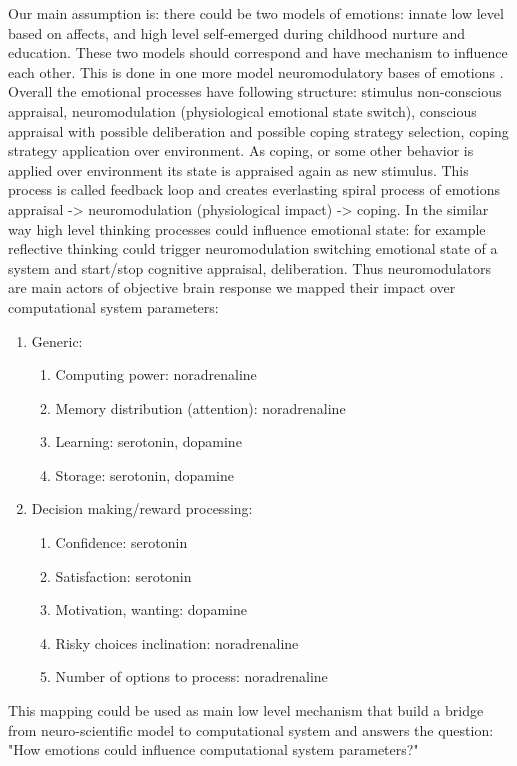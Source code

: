 Our main assumption is: there could be two models of emotions: innate low level based on affects, and high level self-emerged during childhood nurture and education. These two models should correspond and have mechanism to influence each other. This is done in one more model neuromodulatory bases of emotions \cite{cubeofemotions, neuromodulatory}.
Overall the emotional processes have following structure: stimulus non-conscious appraisal, neuromodulation (physiological emotional state switch), conscious appraisal with possible deliberation and possible coping strategy selection, coping strategy application over environment. As coping, or some other behavior is applied over environment its state is appraised again as new stimulus. This process is called feedback loop \cite{natureofemotions} and creates everlasting spiral process of emotions appraisal -> neuromodulation (physiological impact) -> coping. In the similar way high level thinking processes could influence emotional state: for example reflective thinking could trigger neuromodulation switching emotional state of a system and start/stop cognitive appraisal, deliberation.
Thus neuromodulators are main actors of objective brain response we mapped their impact over computational system parameters:

\begin{enumerate}
 \item  Generic:
 \begin{enumerate}
  \item  Computing power: noradrenaline
  \item  Memory distribution (attention): noradrenaline
  \item  Learning: serotonin, dopamine
  \item  Storage: serotonin, dopamine
 \end{enumerate}
 \item  Decision making/reward processing:
 \begin{enumerate}
  \item  Confidence: serotonin
  \item  Satisfaction: serotonin
  \item  Motivation, wanting: dopamine
  \item  Risky choices inclination: noradrenaline
  \item  Number of options to process: noradrenaline
 \end{enumerate}
\end{enumerate}

This mapping could be used as main low level mechanism that build a bridge from neuro-scientific model to computational system and answers the question: "How emotions could influence computational system parameters?"

